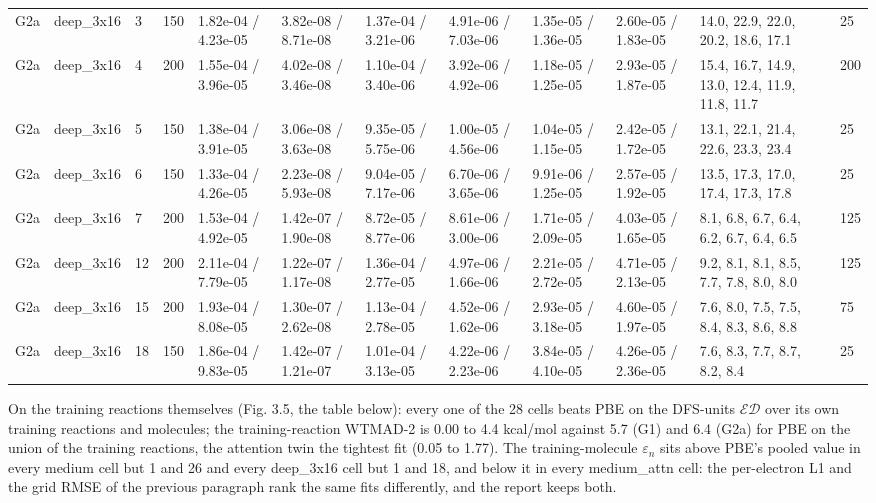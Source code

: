 \documentclass[10pt,a4paper]{article}
\begin{document}
\begin{landscape}
\begin{tiny}
\begin{longtable}{llllllllllll}
G2a & deep\_3x16 & 3 & 150 & 1.82e-04 / 4.23e-05 & 3.82e-08 / 8.71e-08 & 1.37e-04 / 3.21e-06 & 4.91e-06 / 7.03e-06 & 1.35e-05 / 1.36e-05 & 2.60e-05 / 1.83e-05 & 14.0, 22.9, 22.0, 20.2, 18.6, 17.1 & 25 \\
G2a & deep\_3x16 & 4 & 200 & 1.55e-04 / 3.96e-05 & 4.02e-08 / 3.46e-08 & 1.10e-04 / 3.40e-06 & 3.92e-06 / 4.92e-06 & 1.18e-05 / 1.25e-05 & 2.93e-05 / 1.87e-05 & 15.4, 16.7, 14.9, 13.0, 12.4, 11.9, 11.8, 11.7 & 200 \\
G2a & deep\_3x16 & 5 & 150 & 1.38e-04 / 3.91e-05 & 3.06e-08 / 3.63e-08 & 9.35e-05 / 5.75e-06 & 1.00e-05 / 4.56e-06 & 1.04e-05 / 1.15e-05 & 2.42e-05 / 1.72e-05 & 13.1, 22.1, 21.4, 22.6, 23.3, 23.4 & 25 \\
G2a & deep\_3x16 & 6 & 150 & 1.33e-04 / 4.26e-05 & 2.23e-08 / 5.93e-08 & 9.04e-05 / 7.17e-06 & 6.70e-06 / 3.65e-06 & 9.91e-06 / 1.25e-05 & 2.57e-05 / 1.92e-05 & 13.5, 17.3, 17.0, 17.4, 17.3, 17.8 & 25 \\
G2a & deep\_3x16 & 7 & 200 & 1.53e-04 / 4.92e-05 & 1.42e-07 / 1.90e-08 & 8.72e-05 / 8.77e-06 & 8.61e-06 / 3.00e-06 & 1.71e-05 / 2.09e-05 & 4.03e-05 / 1.65e-05 & 8.1, 6.8, 6.7, 6.4, 6.2, 6.7, 6.4, 6.5 & 125 \\
G2a & deep\_3x16 & 12 & 200 & 2.11e-04 / 7.79e-05 & 1.22e-07 / 1.17e-08 & 1.36e-04 / 2.77e-05 & 4.97e-06 / 1.66e-06 & 2.21e-05 / 2.72e-05 & 4.71e-05 / 2.13e-05 & 9.2, 8.1, 8.1, 8.5, 7.7, 7.8, 8.0, 8.0 & 125 \\
G2a & deep\_3x16 & 15 & 200 & 1.93e-04 / 8.08e-05 & 1.30e-07 / 2.62e-08 & 1.13e-04 / 2.78e-05 & 4.52e-06 / 1.62e-06 & 2.93e-05 / 3.18e-05 & 4.60e-05 / 1.97e-05 & 7.6, 8.0, 7.5, 7.5, 8.4, 8.3, 8.6, 8.8 & 75 \\
G2a & deep\_3x16 & 18 & 150 & 1.86e-04 / 9.83e-05 & 1.42e-07 / 1.21e-07 & 1.01e-04 / 3.13e-05 & 4.22e-06 / 2.23e-06 & 3.84e-05 / 4.10e-05 & 4.26e-05 / 2.36e-05 & 7.6, 8.3, 7.7, 8.7, 8.2, 8.4 & 25 \\
\bottomrule \end{longtable}
\end{tiny}
\end{landscape}


On the training reactions themselves (Fig. 3.5, the table below): every one of the 28 cells
beats PBE on the DFS-units $\mathcal{ED}$ over its own training reactions and molecules; the
training-reaction WTMAD-2 is 0.00 to 4.4 kcal/mol against 5.7 (G1) and 6.4 (G2a) for PBE on
the union of the training reactions, the attention twin the tightest fit (0.05 to 1.77). The
training-molecule $\varepsilon_n$ sits above PBE's pooled value in every medium cell but 1
and 26 and every deep\_3x16 cell but 1 and 18, and below it in every medium\_attn cell: the
per-electron L1 and the grid RMSE of the previous paragraph rank the same fits differently,
and the report keeps both.
\end{document}
